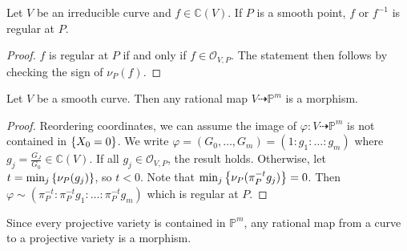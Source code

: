 \begin{corollary}
    Let \( V \) be an irreducible curve and \( f \in \mathbb C(V) \).
    If \( P \) is a smooth point, \( f \) or \( f^{-1} \) is regular at \( P \).
\end{corollary}
\begin{proof}
    \( f \) is regular at \( P \) if and only if \( f \in \mathcal O_{V,P} \).
    The statement then follows by checking the sign of \( \nu_P(f) \).
\end{proof}
\begin{corollary}
    Let \( V \) be a smooth curve.
    Then any rational map \( V \dashrightarrow \mathbb P^m \) is a morphism.
\end{corollary}
\begin{proof}
    Reordering coordinates, we can assume the image of \( \varphi \colon V \dashrightarrow \mathbb P^m \) is not contained in \( \qty{X_0 = 0} \).
    We write \( \varphi = (G_0, \dots, G_m) = (1 : g_1 : \dots : g_m) \) where \( g_j = \frac{G_J}{G_0} \in \mathbb C(V) \).
    If all \( g_j \in \mathcal O_{V,P} \), the result holds.
    Otherwise, let \( t = \min_j \qty{\nu_P(g_j)} \), so \( t < 0 \).
    Note that \( \min_j \qty{\nu_P(\pi_P^{-t} g_j)} = 0 \).
    Then \( \varphi \sim (\pi_P^{-t} : \pi_P^{-t} g_1 : \dots : \pi_P^{-t} g_m) \) which is regular at \( P \).
\end{proof}
Since every projective variety is contained in \( \mathbb P^m \), any rational map from a curve to a projective variety is a morphism.

